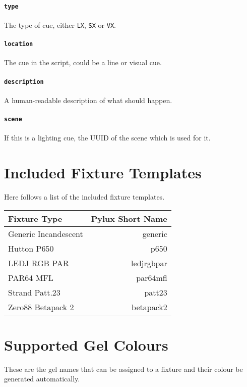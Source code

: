 \documentclass[a4paper]{article}
\begin{document}
\paragraph{\texttt{type}}
The type of cue, either \texttt{LX}, \texttt{SX} or \texttt{VX}.

\paragraph{\texttt{location}}
The cue in the script, could be a line or visual cue.

\paragraph{\texttt{description}}
A human-readable description of what should happen.

\paragraph{\texttt{scene}}
If this is a lighting cue, the UUID of the scene which is used for it.

\appendix
\section{Included Fixture Templates}
Here follows a list of the included fixture templates.
\begin{longtable}{|l|r|}
\hline
Fixture Type & Pylux Short Name \\ \hline
Generic Incandescent & generic \\
Hutton P650 & p650 \\
LEDJ RGB PAR & ledjrgbpar \\
PAR64 MFL & par64mfl \\
Strand Patt.23 & patt23 \\
Zero88 Betapack 2 & betapack2 \\
\hline
\end{longtable}

\section{Supported Gel Colours}
These are the gel names that can be assigned to a fixture and their colour be 
generated automatically.
\end{document}
